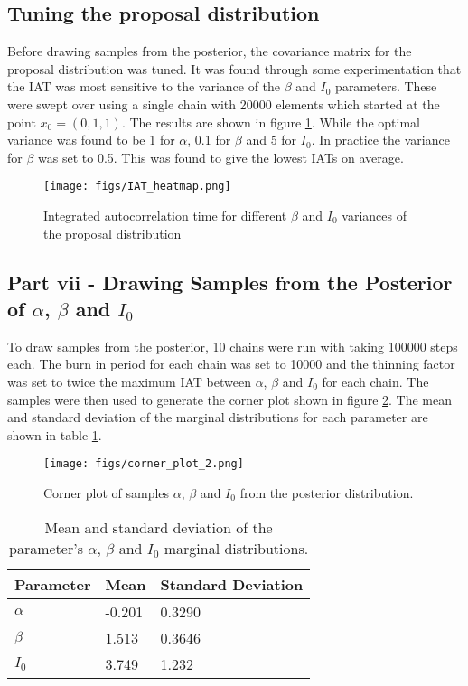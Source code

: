 \documentclass[11pt]{article}
\begin{document}
\subsection{Tuning the proposal distribution}
Before drawing samples from the posterior, the covariance matrix for the proposal distribution was tuned. It was found through some experimentation that the IAT was most sensitive to the variance of the $\beta$ and $I_0$ parameters. These were swept over using a single chain with 20000 elements which started at the point $x_0 = (0, 1, 1)$. The results are shown in figure \ref{fig:std_tuning_2}. While the optimal variance was found to be 1 for $\alpha$, 0.1 for $\beta$ and 5 for $I_0$. In practice the variance for $\beta$ was set to 0.5. This was found to give the lowest IATs on average.

\begin{figure}[H]
    \centering
    \texttt{[image: figs/IAT\_heatmap.png]}
    \caption{Integrated autocorrelation time for different $\beta$ and $I_0$ variances of the proposal distribution}
    \label{fig:std_tuning_2}
\end{figure}
\subsection{Part vii - Drawing Samples from the Posterior of $\alpha$, $\beta$ and $I_0$}
To draw samples from the posterior, 10 chains were run with taking 100000 steps each. The burn in period for each chain was set to 10000 and the thinning factor was set to twice the maximum IAT between $\alpha$, $\beta$ and $I_0$ for each chain. The samples were then used to generate the corner plot shown in figure \ref{fig:corner_plot}. The mean and standard deviation of the marginal distributions for each parameter are shown in table \ref{tab:mean_std_2}.

\begin{figure}[H]
    \centering
    \texttt{[image: figs/corner\_plot\_2.png]}
    \caption{Corner plot of samples $\alpha$, $\beta$ and $I_0$ from the posterior distribution.}
    \label{fig:corner_plot}
\end{figure}

\begin{table}[H]
    \centering
    \begin{tabular}{@{}lll@{}}
    \toprule
    Parameter & Mean & Standard Deviation \\ \midrule
    $\alpha$  & -0.201 & 0.3290 \\
    $\beta$   & 1.513 & 0.3646 \\
    $I_0$    & 3.749 & 1.232 \\ \bottomrule
    \end{tabular}
    \caption{Mean and standard deviation of the parameter's $\alpha$, $\beta$ and $I_0$ marginal distributions.}
    \label{tab:mean_std_2}
\end{table}
\end{document}

